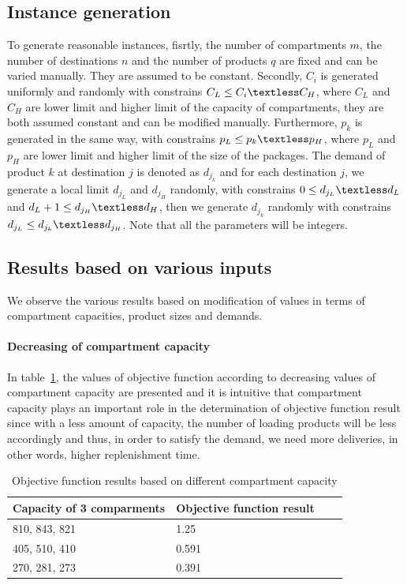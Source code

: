\documentclass{article}
\begin{document}
\subsection{Instance generation}
To generate reasonable instances, fisrtly, the number of compartments $m$, the number of destinations $n$ and the number of products $q$ are fixed and can be varied manually. They are assumed to be constant. Secondly, $C_i$ is generated uniformly and randomly with constrains $C_L \leq C_i \textless C_H$, where $C_L$ and $C_H$ are lower limit and higher limit of the capacity of compartments, they are both assumed constant and can be modified manually. Furthermore, $p_k$ is generated in the same way, with constrains $p_L \leq p_k \textless p_H$, where $p_L$ and $p_H$ are lower limit and higher limit of the size of the packages. The demand of product $k$ at destination $j$ is denoted as $d_{j_k}$ and for each destination $j$, we generate a local limit $d_{j_L}$ and $d_{j_H}$ randomly, with constrains $0 \leq d_{j_L} \textless d_L$ and $d_{L}+1 \leq d_{j_H} \textless d_H$, then we generate $d_{j_k}$ randomly with constrains $d_{j_L} \leq d_{j_k} \textless d_{j_H}$. Note that all the parameters will be integers.

\subsection{Results based on various inputs}
We observe the various results based on modification of values in terms of compartment capacities, product sizes and demands.

\paragraph{Decreasing of compartment capacity}
In table~\ref{tab:capacity variation}, the values of objective function according to decreasing values of compartment capacity are presented and it is intuitive that  compartment capacity plays an important role in the determination of objective function result since with a less amount of capacity, the number of loading products will be less accordingly and thus, in order to satisfy the demand, we need more deliveries, in other words, higher replenishment time. 

\begin{table}[ht]
 \caption{Objective function results based on different compartment capacity}
  \centering
  \begin{tabular}{llll}
    \toprule
    Capacity of 3 comparments   & Objective function result \\
    \midrule
    810, 843, 821	&	1.25	\\
    405, 510, 410	&	0.591	\\
    270, 281, 273	&	0.391	\\
    \bottomrule
  \end{tabular}
  \label{tab:capacity variation}
\end{table}
\end{document}
